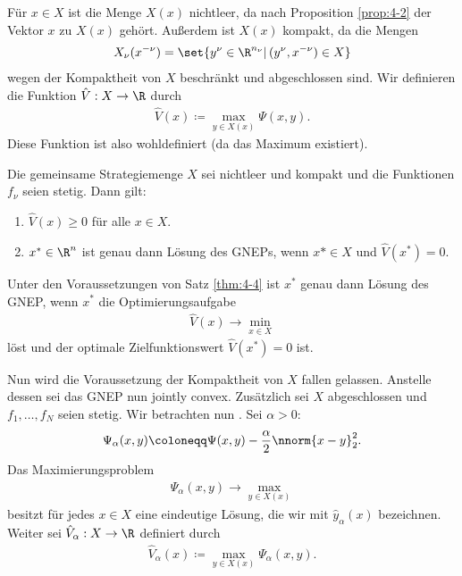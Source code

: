 Für $x \in X$ ist die Menge $X(x)$ nichtleer, da nach Proposition \ref{prop:4-2} der Vektor $x$ zu $X(x)$ gehört. Außerdem ist $X(x)$ kompakt, da die Mengen 
\begin{align*}
  X_{\nu}(x^{-\nu}) = \set{y^{\nu} \in \R^{n_{\nu}}|\, (y^{\nu}, x^{-\nu}) \in X}
\end{align*}
wegen der Kompaktheit von $X$ beschränkt und abgeschlossen sind. Wir definieren die Funktion $\hat V: X \to \R$ durch
\begin{align*}
  \hat V(x) \coloneqq \max_{y \in X(x)}\Psi(x,y). 
\end{align*}
Diese Funktion ist also wohldefiniert (da das Maximum existiert).
\begin{satz}\label{thm:4-4}
  Die gemeinsame Strategiemenge $X$ sei nichtleer und kompakt und die Funktionen $f_{\nu}$ seien stetig. Dann gilt:
  \begin{enumerate}
  \item $\hat V (x) \geq 0$ für alle $x \in X$. 
  \item $x^{*} \in \R^{n}$ ist genau dann Lösung des GNEPs, wenn $x* \in X$ und $\hat V (x^{*}) = 0$. 
  \end{enumerate}
\end{satz}
\begin{korollar}\label{cor:4-5}
  Unter den Voraussetzungen von Satz \ref{thm:4-4} ist $x^{*}$ genau dann Lösung des GNEP, wenn $x^{*}$ die Optimierungsaufgabe 
  \begin{align*}
    \hat V(x)\to \min_{x \in X}
  \end{align*}
löst und der optimale Zielfunktionswert $\hat V (x^{*}) = 0$ ist. 
\end{korollar}
Nun wird die Voraussetzung der Kompaktheit von $X$ fallen gelassen. Anstelle dessen sei das GNEP nun jointly convex. Zusätzlich sei $X$ abgeschlossen und $f_{1}, \dots, f_{N}$ seien stetig. Wir betrachten nun . Sei $\alpha  > 0$:
\begin{align*}
  \Psi_{\alpha}(x, y)\coloneqq \Psi (x, y) - \frac \alpha 2 \nnorm{x - y}_{2}^{2}. 
\end{align*}
Das Maximierungsproblem
\begin{align*}
  \Psi_{\alpha}(x, y) \to \max_{y \in X(x)}
\end{align*}
besitzt für jedes $x \in X$ eine eindeutige Lösung, die wir mit $\hat y_{\alpha}(x)$ bezeichnen. Weiter sei $\hat V_{\alpha}: X \to \R$ definiert durch
\begin{align*}
  \hat V_{\alpha} (x) \coloneqq \max_{y \in X(x)}\Psi_{\alpha}(x, y). 
\end{align*}
